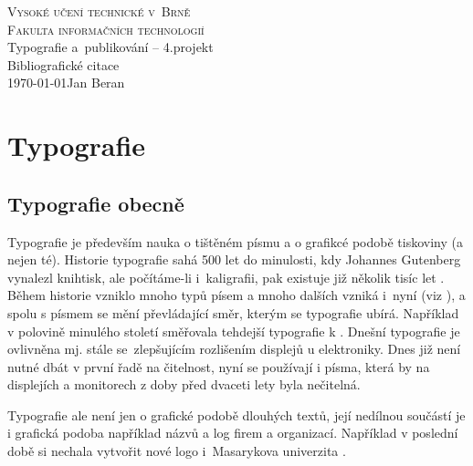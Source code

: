 \documentclass[a4paper, 11pt]{article}
\begin{document}
\begin{titlepage}
	\begin{center}
		\Huge \textsc{Vysoké učení technické v~Brně}\\
		\huge \textsc{Fakulta informačních technologií}\\
		\LARGE Typografie a~publikování – 4.projekt\\
		\Huge {Bibliografické citace}\\
		\Large\today \hfill Jan Beran
	 \end{center}
\end{titlepage}

\newpage %
\section*{Typografie}
\subsection*{Typografie obecně}
Typografie je především nauka o tištěném písmu a o grafikcé podobě tiskoviny (a nejen té). Historie typografie sahá 500 let do minulosti, kdy Johannes Gutenberg vynalezl knihtisk, ale počítáme-li i~kaligrafii, pak existuje již několik tisíc let \cite{Kocicka:Prakticka}. Během historie vzniklo mnoho typů písem a mnoho dalších vzniká i~nyní (viz \cite{Williams:Non-Designer}), a spolu s písmem se mění převládající směr, kterým se typografie ubírá. Například v polovině minulého století směřovala tehdejší typografie k  \cite{Kibbee:Typo48}. Dnešní typografie je ovlivněna mj. stále se~zlepšujícím rozlišením displejů u elektroniky. Dnes již není nutné dbát v první řadě na čitelnost, nyní se používají i písma, která by na displejích a monitorech z doby před dvaceti lety byla nečitelná.

Typografie ale není jen o grafické podobě dlouhých textů, její nedílnou součástí je i grafická podoba například názvů a log firem a organizací. Například v poslední době si nechala vytvořit nové logo i~Masarykova univerzita \cite{TohleLogoSeMiNelibiAStareByloLepsi}.
\end{document}
